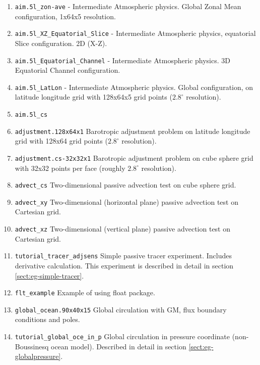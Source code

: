 \begin{enumerate}
\item \texttt{aim.5l\_zon-ave} - Intermediate Atmospheric physics.
  Global Zonal Mean configuration, 1x64x5 resolution.
  
\item \texttt{aim.5l\_XZ\_Equatorial\_Slice} - Intermediate
  Atmospheric physics, equatorial Slice configuration.  2D (X-Z).
  
\item \texttt{aim.5l\_Equatorial\_Channel} - Intermediate Atmospheric
  physics. 3D Equatorial Channel configuration.
  
\item \texttt{aim.5l\_LatLon} - Intermediate Atmospheric physics.
  Global configuration, on latitude longitude grid with 128x64x5 grid
  points ($2.8^\circ$ resolution).
  
\item \texttt{aim.5l_cs}

\item \texttt{adjustment.128x64x1} Barotropic adjustment problem on
  latitude longitude grid with 128x64 grid points ($2.8^\circ$ resolution).
  
\item \texttt{adjustment.cs-32x32x1} Barotropic adjustment problem on
  cube sphere grid with 32x32 points per face (roughly $2.8^\circ$
  resolution).
  
\item \texttt{advect\_cs} Two-dimensional passive advection test on
  cube sphere grid.
  
\item \texttt{advect\_xy} Two-dimensional (horizontal plane) passive
  advection test on Cartesian grid.
  
\item \texttt{advect\_xz} Two-dimensional (vertical plane) passive
  advection test on Cartesian grid.
  
\item \texttt{tutorial\_tracer\_adjsens} Simple passive tracer experiment. Includes
  derivative calculation. This experiment is described in detail in section
  \ref{sect:eg-simple-tracer}.

\item \texttt{flt\_example} Example of using float package.
  
\item \texttt{global\_ocean.90x40x15} Global circulation with GM, flux
  boundary conditions and poles.

\item \texttt{tutorial\_global\_oce\_in\_p} Global circulation in pressure
  coordinate (non-Boussinesq ocean model). Described in detail in
  section \ref{sect:eg-globalpressure}.


\end{enumerate}
